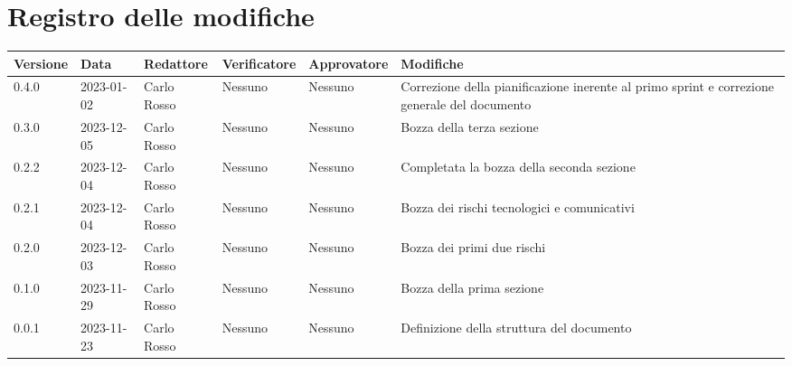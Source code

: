 \section*{Registro delle modifiche}

\begin{table}[H]
	\centering
	\fontsize{10}{12}\selectfont
	\begin{tabularx}{\textwidth}{l|l|l|l|l|X}
		\textbf{Versione} & \textbf{Data} & \textbf{Redattore} & \textbf{Verificatore} & \textbf{Approvatore} & \textbf{Modifiche}                          \\
		\toprule
		0.4.0             & 2023-01-02    & Carlo Rosso        & Nessuno               & Nessuno              & Correzione della pianificazione inerente al
		primo sprint e correzione generale del documento                                                                                                    \\
		0.3.0             & 2023-12-05    & Carlo Rosso        & Nessuno               & Nessuno              & Bozza della terza sezione                   \\
		0.2.2             & 2023-12-04    & Carlo Rosso        & Nessuno               & Nessuno              & Completata la bozza della seconda sezione   \\
		0.2.1             & 2023-12-04    & Carlo Rosso        & Nessuno               & Nessuno              & Bozza dei rischi tecnologici e comunicativi \\
		0.2.0             & 2023-12-03    & Carlo Rosso        & Nessuno               & Nessuno              & Bozza dei primi due rischi                  \\
		0.1.0             & 2023-11-29    & Carlo Rosso        & Nessuno               & Nessuno              & Bozza della prima sezione                   \\
		0.0.1             & 2023-11-23    & Carlo Rosso        & Nessuno               & Nessuno              & Definizione della struttura del documento   \\
		\bottomrule
	\end{tabularx}
\end{table}
